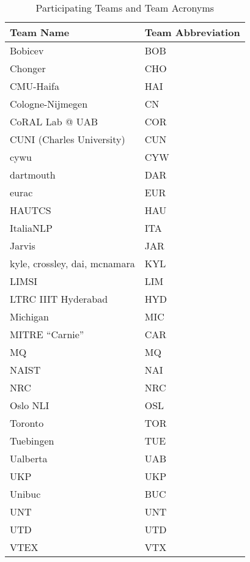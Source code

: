 \documentclass[11pt,letterpaper]{article}
\begin{document}
\begin{table}[!ht]
\begin{small}
\begin{center}
\begin{tabular}{|l|l|}
\hline
\textbf{Team Name} & \textbf{Team Abbreviation} \\ \hline
Bobicev & BOB  \\ \hline
Chonger & CHO  \\ \hline
CMU-Haifa & HAI  \\ \hline
Cologne-Nijmegen &  CN \\ \hline
CoRAL Lab @ UAB &  COR \\ \hline
CUNI (Charles University) &  CUN \\ \hline
cywu &  CYW \\ \hline
dartmouth & DAR  \\ \hline
eurac & EUR  \\ \hline
HAUTCS & HAU  \\ \hline
ItaliaNLP &  ITA \\ \hline
Jarvis &   JAR\\ \hline
kyle, crossley, dai, mcnamara & KYL  \\ \hline
LIMSI & LIM  \\ \hline
LTRC IIIT Hyderabad &  HYD \\ \hline
Michigan &  MIC \\ \hline
MITRE ``Carnie'' & CAR  \\ \hline
MQ &   MQ\\ \hline
NAIST &  NAI \\ \hline
NRC &  NRC \\ \hline
Oslo NLI & OSL  \\ \hline
Toronto &  TOR \\ \hline
Tuebingen &   TUE\\ \hline
Ualberta &  UAB \\ \hline
UKP &  UKP \\ \hline
Unibuc &  BUC \\ \hline
UNT &   UNT\\ \hline
UTD &  UTD \\ \hline
VTEX &  VTX \\ \hline

\end{tabular}
\end{center}
\end{small}
\caption{Participating Teams and Team Acronyms\label{tab:teams}}

\end{table}
\end{document}
